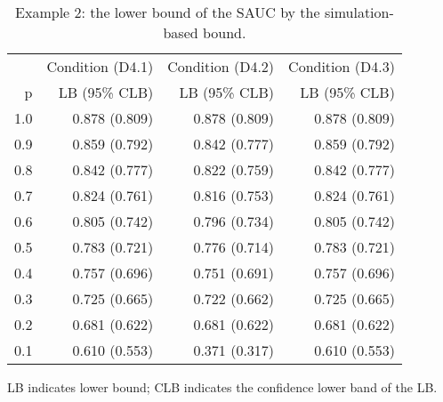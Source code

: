 \begin{table}

\caption{\label{tab:tab2}Example 2: the lower bound of the SAUC by the simulation-based bound.}
\centering
\begin{threeparttable}
\begin{tabular}[t]{rrrr}
\toprule
\multicolumn{1}{c}{} & \multicolumn{1}{c}{Condition (D4.1)} & \multicolumn{1}{c}{Condition (D4.2)} & \multicolumn{1}{c}{Condition (D4.3)} \\
\cmidrule(l{3pt}r{3pt}){2-2} \cmidrule(l{3pt}r{3pt}){3-3} \cmidrule(l{3pt}r{3pt}){4-4}
p & LB (95\% CLB) & LB (95\% CLB) & LB (95\% CLB)\\
\midrule
1.0 & 0.878 (0.809) & 0.878 (0.809) & 0.878 (0.809)\\
0.9 & 0.859 (0.792) & 0.842 (0.777) & 0.859 (0.792)\\
0.8 & 0.842 (0.777) & 0.822 (0.759) & 0.842 (0.777)\\
0.7 & 0.824 (0.761) & 0.816 (0.753) & 0.824 (0.761)\\
0.6 & 0.805 (0.742) & 0.796 (0.734) & 0.805 (0.742)\\
0.5 & 0.783 (0.721) & 0.776 (0.714) & 0.783 (0.721)\\
0.4 & 0.757 (0.696) & 0.751 (0.691) & 0.757 (0.696)\\
0.3 & 0.725 (0.665) & 0.722 (0.662) & 0.725 (0.665)\\
0.2 & 0.681 (0.622) & 0.681 (0.622) & 0.681 (0.622)\\
0.1 & 0.610 (0.553) & 0.371 (0.317) & 0.610 (0.553)\\
\bottomrule
\end{tabular}
\begin{tablenotes}
\item 
           LB indicates lower bound; CLB indicates the confidence lower band of the LB.
\end{tablenotes}
\end{threeparttable}
\end{table}
